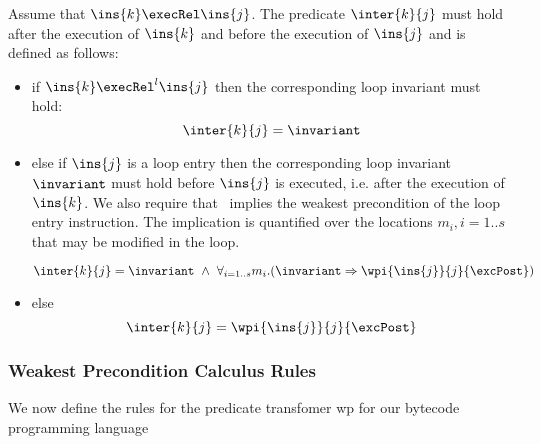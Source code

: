 \begin{defn}\label{inter}
Assume that $\ins{k} \execRel \ins{j}$. The predicate $\inter{k}{ j}$ must hold after the execution of $\ins{k}$ and before the execution of 
$\ins{j}$ and is defined as follows:
\begin{itemize}
\item if  $\ins{k} \execRel^l \ins{j}$
then the corresponding loop invariant must hold:
$$
\inter{k}{j} =  \invariant
$$

\item else if $\ins{j}$ is a loop entry then the corresponding loop invariant $\invariant$ must hold before $\ins{j}$ is executed, 
i.e. after the execution of $\ins{k}$. We also require that \invariant \ implies the weakest precondition of the loop entry instruction. 
The implication is quantified over the locations $m_i , i= 1..s$ that may be modified in the loop.

$$
\inter{k}{j}= \invariant \ \wedge \ \forall_{i = 1..s} m_i.(
\invariant \Rightarrow \wpi{\ins{j}}{j}{ \excPost })
$$
\item else 
$$
\inter{k}{j} = \wpi{ \ins{j} }{j}{\excPost}
$$
\end{itemize}
\end{defn}




 
\subsubsection{Weakest Precondition Calculus Rules} \label{wprules}

We now define the rules for the predicate transfomer \textrm{wp} for our bytecode programming language

